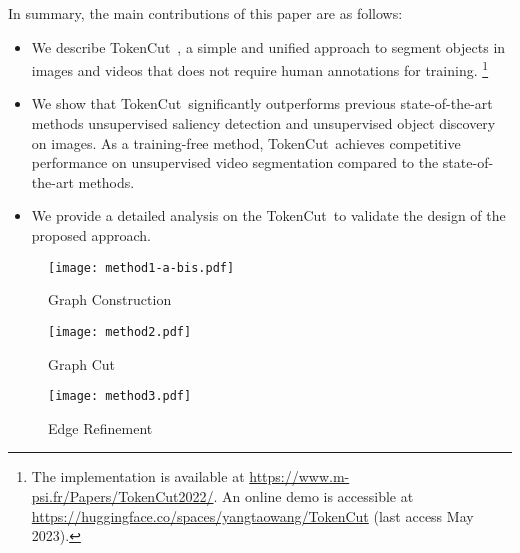 \documentclass[twocolumn]{article}
\newenvironment{Itemize}{
\setlength{\leftmargini}{9pt}\begin{itemize}\setlength{\itemsep}{0pt}\setlength{\topsep}{0pt}\setlength{\partopsep}{0pt}\setlength{\parskip}{0pt}}{\end{itemize}}
\newcommand{\name} {TokenCut}
\begin{document}
In summary, the main contributions of this paper are as follows:
\begin{Itemize}

\item We describe \name~, a simple and unified approach to segment objects in images and videos that does not require human annotations for training.  \footnote{The implementation is available at \href{https://www.m-psi.fr/Papers/TokenCut2022/}{https://www.m-psi.fr/Papers/TokenCut2022/}. An online demo is accessible at \href{https://huggingface.co/spaces/yangtaowang/TokenCut}{https://huggingface.co/spaces/yangtaowang/TokenCut} (last access May 2023).}

\item We show that  \name~significantly outperforms previous state-of-the-art methods unsupervised saliency detection and unsupervised object discovery on images. As a training-free method, \name~achieves competitive performance on unsupervised video segmentation compared to the state-of-the-art methods.

\item We provide a detailed analysis on the \name~to validate the design of the proposed approach.

\end{Itemize}



\begin{figure*}[!thbp]
	\centering
	 \begin{subfigure}[b]{0.41\textwidth}
         \centering
         \texttt{[image: method1-a-bis.pdf]}
         \caption{Graph Construction}
         \label{fig:graph_building}
     \end{subfigure}
     \hfill
     \begin{subfigure}[b]{0.38\textwidth}
         \centering
         \texttt{[image: method2.pdf]}
         \caption{Graph Cut}
         \label{fig:graph_cut}
     \end{subfigure}
     \hfill
     \begin{subfigure}[b]{0.2\textwidth}
         \centering
         \texttt{[image: method3.pdf]}
         \caption{Edge Refinement}
         \label{fig:edge_refiner}
     \end{subfigure}
     
	\caption{An overview of the TokenCut approach. The algorithm constructs a fully connected graph in which the nodes are image patches and the edges are similarities between the image patches using transformer features. Object segmentation is then solved using the Ncut algorithm~\cite{shi2000normalized}. Bi-partition of the graph using the second smallest eigenvector allows to detect foreground object. A Bilateral Solver~\cite{barron2016fast} (BS) or Conditional Random Field~\cite{krahenbuhl2011efficient} (CRF) can be used for edge refinement.}
	\label{fig:method}	
\end{figure*}
\end{document}
